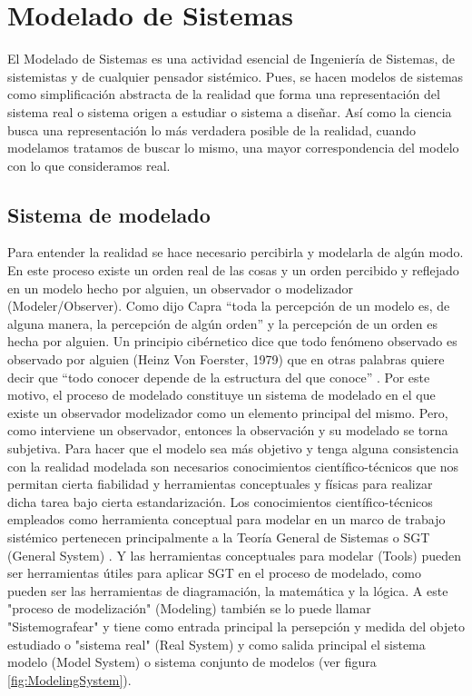 
\chapter{Modelado de Sistemas}

El Modelado de Sistemas es una actividad esencial de Ingeniería de Sistemas, de sistemistas y de cualquier pensador sistémico. Pues, se hacen modelos de sistemas como simplificación abstracta de la realidad \cite{Meadows-2009} que forma una representación del sistema real \cite{Fiuba-2005} o sistema origen a estudiar o sistema a diseñar. Así como la ciencia busca una representación lo más verdadera posible de la realidad, cuando modelamos tratamos de buscar lo mismo, una mayor correspondencia del modelo con lo que consideramos real.

\section{Sistema de modelado}

Para entender la realidad se hace necesario percibirla y modelarla de algún modo. En este proceso existe un orden real de las cosas y un orden percibido y reflejado en un modelo hecho por alguien, un observador o modelizador (Modeler/Observer). Como dijo Capra “toda la percepción de un modelo es, de alguna manera, la percepción de algún orden” \cite{Fritjof-Capra-1975} y la percepción de un orden es hecha por alguien. Un principio cibérnetico dice que todo fenómeno observado es observado por alguien (Heinz Von Foerster, 1979) que en otras palabras quiere decir que “todo conocer depende de la estructura del que conoce” \cite{Maturana-1984}. Por este motivo, el proceso de modelado constituye un sistema de modelado en el que existe un observador modelizador como un elemento principal del mismo. Pero, como interviene un observador, entonces la observación y su modelado se torna subjetiva. Para hacer que el modelo sea más objetivo y tenga alguna consistencia con la realidad modelada son necesarios conocimientos científico-técnicos que nos permitan cierta fiabilidad y herramientas conceptuales y físicas para realizar dicha tarea bajo cierta estandarización. Los conocimientos científico-técnicos empleados como herramienta conceptual para modelar en un marco de trabajo sistémico pertenecen principalmente a la Teoría General de Sistemas o SGT (General System) \cite{Sarabia-1995}. Y las herramientas conceptuales para modelar (Tools) pueden ser herramientas útiles para aplicar SGT en el proceso de modelado, como pueden ser las herramientas de diagramación, la matemática y la lógica. A este "proceso de modelización" (Modeling) también se lo puede llamar "Sistemografear" \cite{Le-Moigne-1994} y tiene como entrada principal la persepción y medida del objeto estudiado o "sistema real" (Real System) y como salida principal el sistema modelo (Model System) o sistema conjunto de modelos (ver figura \ref{fig:ModelingSystem}).


